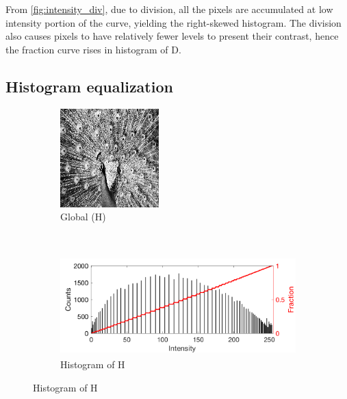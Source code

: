 \documentclass[12pt]{article}
\begin{document}
From \autoref{fig:intensity_div}, due to division, all the pixels are accumulated at low intensity portion of the curve, yielding the right-skewed histogram. 
The division also causes pixels to have relatively fewer levels to present their contrast, hence the fraction curve rises in histogram of D.

\subsection*{Histogram equalization}
\begin{figure}[ht!]
    \centering
    \begin{subfigure}[t]{0.3\textwidth}
        \centering
        \includegraphics[height=1.5in]{images/H}
        \caption{Global (H)}
    \end{subfigure}%
    ~ 
    \begin{subfigure}[t]{0.7\textwidth}
        \centering
        \includegraphics[height=1.5in]{images/H_histogram}
        \caption{Histogram of H}
        \label{fig:H_hist}
    \end{subfigure}%
    

\end{figure}
\end{document}
